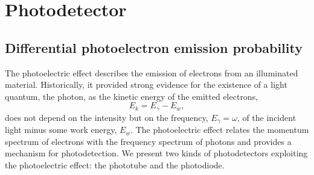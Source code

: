 \section{Photodetector}


\subsection{Differential photoelectron emission probability}

The photoelectric effect describes the emission of electrons from an illuminated material.
Historically, it provided strong evidence for the existence of a light quantum, the photon, as the kinetic energy of the emitted electrons,
\begin{equation}
	E_k
	=
	E_\gamma
	-
	E_w
	\label{eq:photoelectric_effect}
	,
\end{equation}
does not depend on the intensity but on the frequency, $E_\gamma=\omega$, of the incident light minus some work energy, $E_w$.
The photoelectric effect relates the momentum spectrum of electrons with the frequency spectrum of photons and provides a mechanism for photodetection.
We present two kinds of photodetectors exploiting the photoelectric effect: the phototube and the photodiode.

